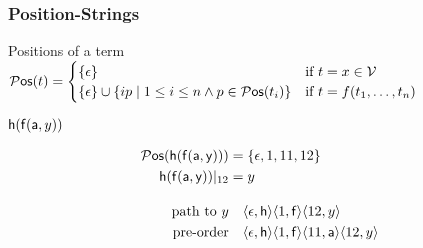 
\begin{frame}
\frametitle{Position-Strings}
\begin{exampleblock}{Positions of a term}
$
	{}{\mathcal P}\mathsf{os}(t) =  
	\begin{cases}
		\{ \epsilon \} & \text{if }t=x\in{\mathcal V} \\
		\{ \epsilon \} \cup \{ ip\mid 1\leq i\leq n \land p\in{}{\mathcal P}\mathsf{os}(t_i)\} &
		\text{if }t=f(t_1,\ldots,t_n)
	\end{cases}
$
\end{exampleblock}

%

\begin{exampleblock}{${\mathsf h}({\mathsf f}({\mathsf a},y))$}
\begin{minipage}[c]{3cm}
\end{minipage}
%
\begin{minipage}[c]{8cm}
\begin{align*}
{}{\mathcal P}\mathsf{os}({\mathsf h}({\mathsf f}({\mathsf a},{\mathsf y}))) &= \{ \epsilon, 1, 11, 12 \}
\\
{\mathsf h}({\mathsf f}({\mathsf a},{\mathsf y}))|_{12} &= y
\\[1em]
\text{path to }y &\quad 
\langle\epsilon,{\mathsf h}\rangle\langle1,{\mathsf f}\rangle\langle12,y\rangle
\\
\text{pre-order} &\quad
\langle\epsilon,{\mathsf h}\rangle\langle1,{\mathsf f}\rangle\langle11,{\mathsf a}\rangle\langle12,y\rangle
\\
\end{align*}
%
\end{minipage}
\end{exampleblock}
\end{frame}

